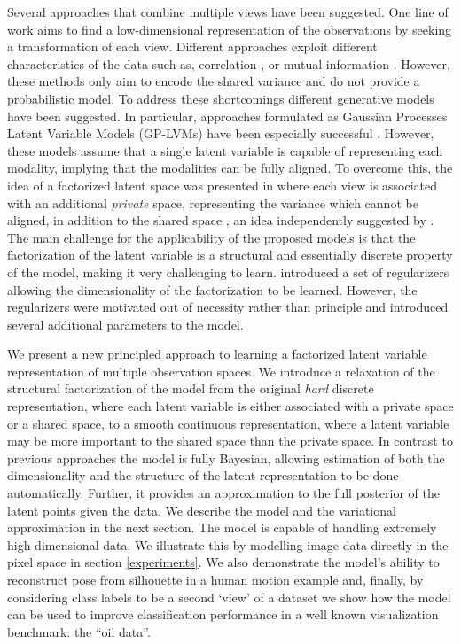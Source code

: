 Several approaches that combine multiple views have been suggested.
One line of work aims to find a low-dimensional representation of the
observations by seeking a transformation of each view. Different
approaches exploit different characteristics of the data such as,
correlation \cite{Kuss:2003wp,Ham:2005vs}, or mutual information
\cite{Memisevic:2011tq}. However, these methods only aim to encode the
shared variance and do not provide a probabilistic model. To address
these shortcomings different generative models have been suggested.
In particular, approaches formulated as Gaussian Processes Latent
Variable Models (GP-LVMs) \cite{Lawrence:2005vk} have been especially
successful \cite{Shon:2006wr,Ek:2007uo}. However, these models assume
that a single latent variable is capable of representing each
modality, implying that the modalities can be fully aligned.  To
overcome this, the idea of a factorized latent space was presented in
\cite{Ek:2008up} where each view is associated with an additional
\emph{private} space, representing the variance which cannot be
aligned, in addition to the shared space \cite{Ek:2009vv}, an idea
independently suggested by \citet{Klami06mlsp}.  The main challenge for the
applicability of the proposed models is that the factorization of the
latent variable is a structural and essentially discrete property of
the model, making it very challenging to
learn. \citet{Salzmann:2010vh} introduced a set of regularizers
allowing the dimensionality of the factorization to be learned.
However, the regularizers were motivated out of necessity rather than
principle and introduced several additional parameters to the model.

We present a new principled approach to learning a factorized latent
variable representation of multiple observation spaces. We introduce a
relaxation of the structural factorization of the model from the
original \emph{hard} discrete representation, where each latent
variable is either associated with a private space or a shared space,
to a smooth continuous representation, where a latent variable may be
more important to the shared space than the private space. In contrast
to previous approaches the model is fully Bayesian, allowing
estimation of both the dimensionality and the structure of the latent
representation to be done automatically. Further, it provides an approximation to the full posterior of the latent points given the data.%
 We describe the model and the
variational approximation in the next section. The model is capable of
handling extremely high dimensional data. We illustrate this by
modelling image data directly in the pixel space in section
\ref{experiments}. We also demonstrate the model's ability to reconstruct pose from silhouette in a human motion example and, finally, by considering class labels to be a second `view' of a dataset we show how the model can be used to improve classification performance in a well known visualization benchmark: the ``oil data''.

